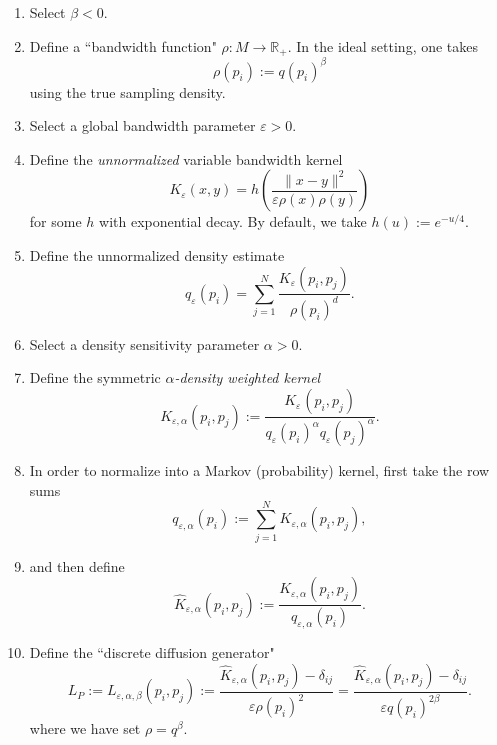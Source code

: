 \documentclass{article}
\theoremstyle{remark}
\theoremstyle{plain}
\begin{document}
\begin{enumerate}
    \item Select $\beta < 0.$
    \item Define a ``bandwidth function" \( \rho:M \to \mathbb{R}_{+} \). In the ideal setting, one takes
    \begin{equation}
        \rho(p_i) := q(p_i)^\beta 
    \end{equation} using the true sampling density. 
    \item Select a global bandwidth parameter $\varepsilon > 0$. 
    \item Define the \textit{unnormalized} variable bandwidth kernel 
    \begin{equation}
       K_{\varepsilon}(x,y)=h\left(\frac{\|x-y\|^{2}}{\varepsilon \rho(x) \rho(y)}\right)     \end{equation}for some $h$ with exponential decay. By default, we take $h(u):=e^{-u/4}$. 



    \item Define the unnormalized density estimate
    \begin{equation}
        q_\varepsilon(p_i) = \sum_{j=1}^N \dfrac{K_\varepsilon^{}(p_i,p_j)}{\rho(p_i)^d}.
    \end{equation}
    \item Select a density sensitivity parameter $\alpha > 0.$
    \item Define the symmetric \textit{$\alpha$-density weighted kernel} 
    \begin{equation}
        K_{\varepsilon,\alpha}^{}(p_i, p_j) := \dfrac{{K_\varepsilon}^{}(p_i,p_j)}{q_\varepsilon^{}(p_i)^\alpha q_\varepsilon^{}(p_j)^\alpha}.
    \end{equation}
    \item In order to normalize into a Markov (probability) kernel, first take the row sums
    \begin{equation}
        q_{\varepsilon,\alpha}^{}(p_i) := \sum_{j=1}^N K_{\varepsilon,\alpha}^{}(p_i,p_j),
    \end{equation}
    \item and then define 
    \begin{equation}
        \hat{K}^{}_{\varepsilon,\alpha}(p_i,p_j) := \dfrac{K_{\varepsilon,\alpha}^{}(p_i,p_j)}{q_{\varepsilon,\alpha}^{}(p_i)}.
    \end{equation}
    \item Define the ``discrete diffusion generator"
    \begin{equation} \label{discrete-variable-bandwidth-laplacian}
       L_{P}:= L_{\varepsilon,\alpha,\beta}^{}(p_i,p_j) := \dfrac{ \hat{K}_{\varepsilon,\alpha}^{}(p_i,p_j)-\delta_{ij}}{\varepsilon \rho(p_i)^2} =  \dfrac{ \hat{K}_{\varepsilon,\alpha}^{}(p_i,p_j)-\delta_{ij}}{\varepsilon q(p_i)^{2\beta}}.
    \end{equation} where we have set $\rho = q^\beta$. 
\end{enumerate}
\end{document}
